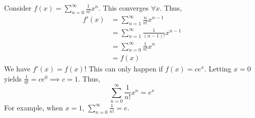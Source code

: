\documentclass{article}
\begin{document}
      \begin{example}
        Consider $f(x) = \sum_{n=0}^\infty \frac{1}{n!}x^n$. This converges $\forall x$.
        Thus,
        \begin{align*}
          f'(x) &= \sum_{n=1}^\infty \frac{n}{n!}x^{n-1}\\
          &= \sum_{n=1}^\infty \frac{1}{(n-1)!}x^{n-1}\\
          &= \sum_{n=0}^\infty \frac{1}{n!}x^n\\
          &= f(x)
        \end{align*}
        We have $f'(x) = f(x)$! This can only happen if $f(x) = ce^x$. Letting $x = 0$ yields $\frac{1}{0!} = ce^0 \implies c = 1$. Thus, \[
          \sum_{n=0}^\infty \frac{1}{n!}x^n = e^x
        \]
        For example, when $x=1$, $\sum_{n=0}^\infty \frac{1}{n!} = e$.
      \end{example}
\end{document}
